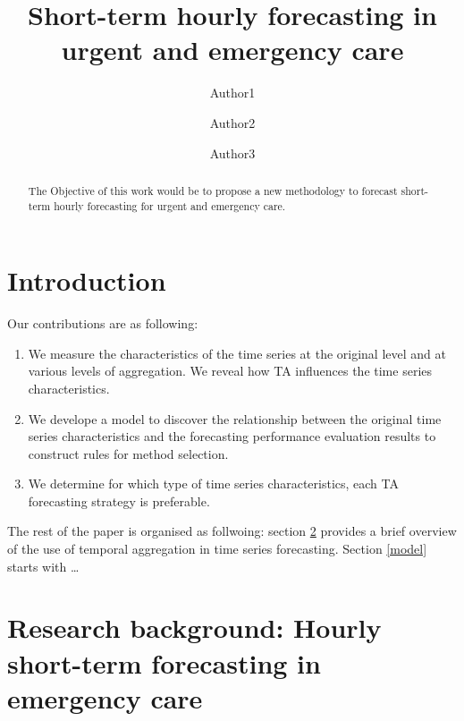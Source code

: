 \documentclass[]{elsarticle} %
\providecommand{\tightlist}{%
  \setlength{\itemsep}{0pt}\setlength{\parskip}{0pt}}
\begin{document}
\begin{frontmatter}

  \title{Short-term hourly forecasting in urgent and emergency care}
    \author[University1]{Author1}
    \author[University2]{Author2}
    \author[University3]{Author3}
      \address[University1]{Cardiff business school, 3 Colum Drive, CF10 3EU, Cardiff}
    \address[University2]{adress2}
    \address[University3]{adress3}
  
  \begin{abstract}
  The Objective of this work would be to propose a new methodology to forecast short-term hourly forecasting for urgent and emergency care.
  \end{abstract}
  
 \end{frontmatter}

\hypertarget{introduction}{%
\section{Introduction}\label{introduction}}

Our contributions are as following:

\begin{enumerate}
\def\labelenumi{\arabic{enumi}.}
\tightlist
\item
  We measure the characteristics of the time series at the original level and at various levels of aggregation. We reveal how TA influences the time series characteristics.
\item
  We develope a model to discover the relationship between the original time series characteristics and the forecasting performance evaluation results to construct rules for method selection.
\item
  We determine for which type of time series characteristics, each TA forecasting strategy is preferable.
\end{enumerate}

The rest of the paper is organised as follwoing: section \ref{lit} provides a brief overview of the use of temporal aggregation in time series forecasting. Section \ref{model} starts with \ldots{}

\hypertarget{lit}{%
\section{Research background: Hourly short-term forecasting in emergency care}\label{lit}}
\end{document}
